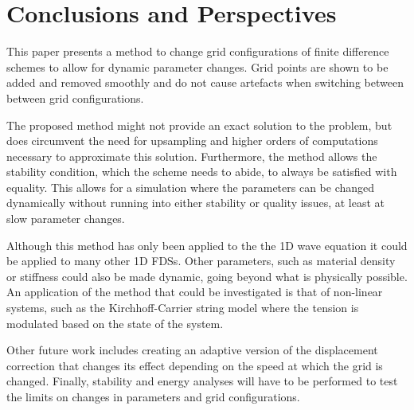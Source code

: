 \section{Conclusions and Perspectives}\label{sec:conclusion}
This paper presents a method to change grid configurations of finite difference schemes to allow for dynamic parameter changes. Grid points are shown to be added and removed smoothly and do not cause artefacts when switching between between grid configurations. 

The proposed method might not provide an exact solution to the problem, but does circumvent the need for upsampling and higher orders of computations necessary to approximate this solution. %
%
Furthermore, the method allows the stability condition, which the scheme needs to abide, to always be satisfied with equality. This allows for a simulation where the parameters can be changed dynamically without running into either stability or quality issues, at least at slow parameter changes.


Although this method has only been applied to the the 1D wave equation it could be applied to many other 1D FDSs. Other parameters, such as material density or stiffness could also be made dynamic, going beyond what is physically possible. An application of the method that could be investigated is that of non-linear systems, such as the Kirchhoff-Carrier string model \cite{Carrier1945} where the tension is modulated based on the state of the system.

Other future work includes creating an adaptive version of the displacement correction that changes its effect depending on the speed at which the grid is changed. Finally, stability and energy analyses will have to be performed to test the limits on changes in parameters and grid  configurations.
